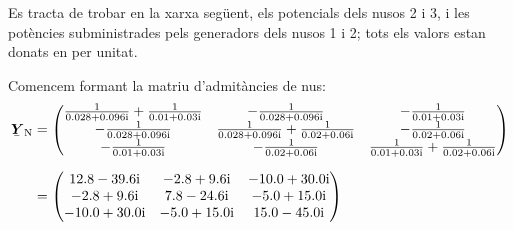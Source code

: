 \begin{exemple}\label{ex:FluxCarrXarxa}
	\addcontentsxms{\FluxCarrXarxa}
    Es tracta de trobar en la xarxa següent, els potencials dels nusos 2
    i 3, i les potències subministrades pels generadors dels nusos 1 i 2;
    tots els valors estan donats en per unitat.
    \begin{center}
        
    \end{center}

    Comencem formant la matriu d'admitàncies de nus:
    \begin{align*}
    \mcmplx{Y}\ped{N} &= \begin{pmatrix}
    \frac{1}{\complexnum{0,028+j0,096}} + \frac{1}{\complexnum{0,01+j0,03}} & -\frac{1}{\complexnum{0,028+j0,096}}  &  -\frac{1}{\complexnum{0,01+j0,03}}\\
    -\frac{1}{\complexnum{0,028+j0,096}} & \frac{1}{\complexnum{0,028+j0,096}} + \frac{1}{\complexnum{0,02+j0,06}} &  -\frac{1}{\complexnum{0,02+j0,06}}\\
    -\frac{1}{\complexnum{0,01+j0,03}} & -\frac{1}{\complexnum{0,02+j0,06}} &
    \frac{1}{\complexnum{0,01+j0,03}} + \frac{1}{\complexnum{0,02+j0,06}}
    \end{pmatrix}  \\[1.5ex]
     &= \begin{pmatrix}
    \complexnum{12,8 - j 39,6} & \complexnum{-2,8 + j 9,6} & \complexnum{-10,0 + j 30,0} \\
    \complexnum{-2,8 + j 9,6} & \complexnum{7,8 - j 24,6} & \complexnum{-5,0 + j 15,0} \\
    \complexnum{-10,0 + j 30,0} & \complexnum{-5,0 + j 15,0} & \complexnum{15,0 - j 45,0}
    \end{pmatrix}
    \end{align*}


\end{exemple}
